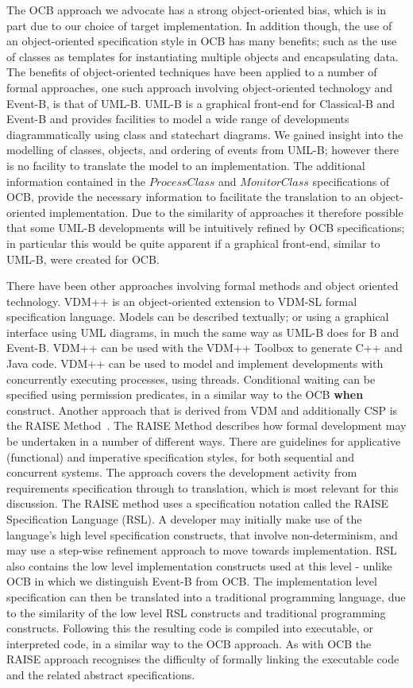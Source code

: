 The OCB approach we advocate has a strong object-oriented bias, which is in part due to our choice of target implementation. In addition though, the use of an object-oriented specification style in OCB has many benefits; such as the use of classes as templates for instantiating multiple objects and encapsulating data. The benefits of object-oriented techniques have been applied to a number of formal approaches, one such approach involving object-oriented technology and Event-B, is that of UML-B. UML-B is a graphical front-end for Classical-B and Event-B and provides facilities to model a wide range of developments diagrammatically using class and statechart diagrams. We gained insight into the modelling of classes, objects, and ordering of events from UML-B; however there is no facility to translate the model to an implementation. The additional information contained in the $ProcessClass$ and $MonitorClass$ specifications of OCB, provide the necessary information to facilitate the translation to an object-oriented implementation. Due to the similarity of approaches it therefore possible that some UML-B developments will be intuitively refined by OCB specifications; in particular this would be quite apparent if a graphical front-end, similar to UML-B, were created for OCB. 

There have been other approaches involving formal methods and object oriented technology. VDM++ is an object-oriented extension to VDM-SL formal specification language. Models can be described textually; or using a graphical interface using UML diagrams, in much the same way as UML-B does for B and Event-B. VDM++ can be used with the VDM++ Toolbox to generate C++ and Java code. VDM++ can be used to model and implement developments with concurrently executing processes, using threads. Conditional waiting can be specified using permission predicates, in a similar way to the OCB \textbf{when} construct. Another approach that is derived from VDM and additionally CSP is the RAISE Method~\cite{Raise99}. The RAISE Method describes how formal development may be undertaken in a number of different ways. There are guidelines for applicative (functional) and imperative specification styles, for both sequential and concurrent systems. The approach covers the development activity from requirements specification through to translation, which is most relevant for this discussion. The RAISE method uses a specification notation called the RAISE Specification Language (RSL). A developer may initially make use of the language's high level specification constructs, that involve non-determinism, and may use a step-wise refinement approach to move towards implementation. RSL also contains the low level implementation constructs used at this level - unlike OCB in which we distinguish Event-B from OCB. The implementation level specification can then be translated into a traditional programming language, due to the similarity of the low level RSL constructs and traditional programming constructs. Following this the resulting code is compiled into executable, or interpreted code, in a similar way to the OCB approach. As with OCB the RAISE approach recognises the difficulty of formally linking the executable code and the related abstract specifications.

